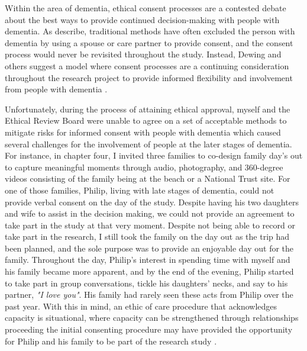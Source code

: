 Within the area of dementia, ethical consent processes are a contested debate about the best ways to provide continued decision-making with people with dementia. As \cite{dewing_participatory_2007} describe, traditional methods have often excluded the person with dementia by using a spouse or care partner to provide consent, and the consent process would never be revisited throughout the study. Instead, Dewing and others suggest a model where consent processes are a continuing consideration throughout the research project to provide informed flexibility and involvement from people with dementia \citep{dewing_participatory_2007,slaughter2007consent,mckeown_actively_2009}. 

Unfortunately, during the process of attaining ethical approval, myself and the Ethical Review Board were unable to agree on a set of acceptable methods to mitigate risks for informed consent with people with dementia which caused several challenges for the involvement of people at the later stages of dementia. For instance, in chapter four, I invited three families to co-design family day's out to capture meaningful moments through audio, photography, and 360-degree videos consisting of the family being at the beach or a National Trust site. For one of those families, Philip, living with late stages of dementia, could not provide verbal consent on the day of the study. Despite having his two daughters and wife to assist in the decision making, we could not provide an agreement to take part in the study at that very moment. 
Despite not being able to record or take part in the research, I still took the family on the day out as the trip had been planned, and the sole purpose was to provide an enjoyable day out for the family. Throughout the day, Philip's interest in spending time with myself and his family became more apparent, and by the end of the evening, Philip started to take part in group conversations, tickle his daughters' necks, and say to his partner, \textit{"I love you"}. His family had rarely seen these acts from Philip over the past year. With this in mind, an ethic of care procedure that acknowledges capacity is situational, where capacity can be strengthened through relationships proceeding the initial consenting procedure may have provided the opportunity for Philip and his family to be part of the research study \citep{lloyd2004mortality}.

